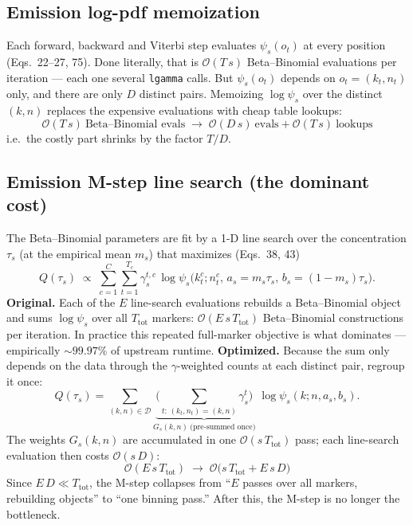 \documentclass[11pt]{article}
\newcommand{\code}[1]{\texttt{#1}}
\newcommand{\bigO}{\mathcal{O}}
\begin{document}
\subsection{Emission log-pdf memoization}
Each forward, backward and Viterbi step evaluates $\psi_s(o_t)$ at every position
(Eqs.~22--27, 75). Done literally, that is $\bigO(T\,s)$ Beta--Binomial evaluations
per iteration --- each one several \code{lgamma} calls. But $\psi_s(o_t)$ depends on
$o_t=(k_t,n_t)$ only, and there are only $D$ distinct pairs. Memoizing $\log\psi_s$
over the distinct $(k,n)$ replaces the expensive evaluations with cheap table
lookups:
\[
\boxed{\;\bigO(T\,s)\ \text{Beta--Binomial evals}\;\longrightarrow\;\bigO(D\,s)\ \text{evals} + \bigO(T\,s)\ \text{lookups}\;}
\]
i.e.\ the costly part shrinks by the factor $T/D$.

\subsection{Emission M-step line search (the dominant cost)}
The Beta--Binomial parameters are fit by a 1-D line search over the concentration
$\tau_s$ (at the empirical mean $m_s$) that maximizes (Eqs.~38, 43)
\begin{equation}
Q(\tau_s)\;\propto\;\sum_{c=1}^{C}\sum_{t=1}^{T_c}\gamma^{t,c}_s\,
\log\psi_s\!\big(k^{c}_t;n^{c}_t,\,a_s=m_s\tau_s,\,b_s=(1-m_s)\tau_s\big).
\tag{43}
\end{equation}
\textbf{Original.} Each of the $E$ line-search evaluations rebuilds a Beta--Binomial
object and sums $\log\psi_s$ over all $T_{\text{tot}}$ markers:
$\bigO(E\,s\,T_{\text{tot}})$ Beta--Binomial constructions per iteration. In practice
this repeated full-marker objective is what dominates --- empirically
$\sim 99.97\%$ of upstream runtime.
\textbf{Optimized.} Because the sum only depends on the data through the
$\gamma$-weighted counts at each distinct pair, regroup it once:
\begin{equation}
Q(\tau_s)=\sum_{(k,n)\in\mathcal D}\!\underbrace{\Big(\!\!\sum_{t:\,(k_t,n_t)=(k,n)}\!\!\gamma^{t}_s\Big)}_{G_s(k,n)\ \text{(pre-summed once)}}\;\log\psi_s(k;n,a_s,b_s).
\end{equation}
The weights $G_s(k,n)$ are accumulated in one $\bigO(s\,T_{\text{tot}})$ pass; each
line-search evaluation then costs $\bigO(s\,D)$:
\[
\boxed{\;\bigO(E\,s\,T_{\text{tot}})\;\longrightarrow\;\bigO\big(s\,T_{\text{tot}}+E\,s\,D\big)\;}
\]
Since $E\,D\ll T_{\text{tot}}$, the M-step collapses from ``$E$ passes over all
markers, rebuilding objects'' to ``one binning pass.'' After this, the M-step is no
longer the bottleneck.
\end{document}

